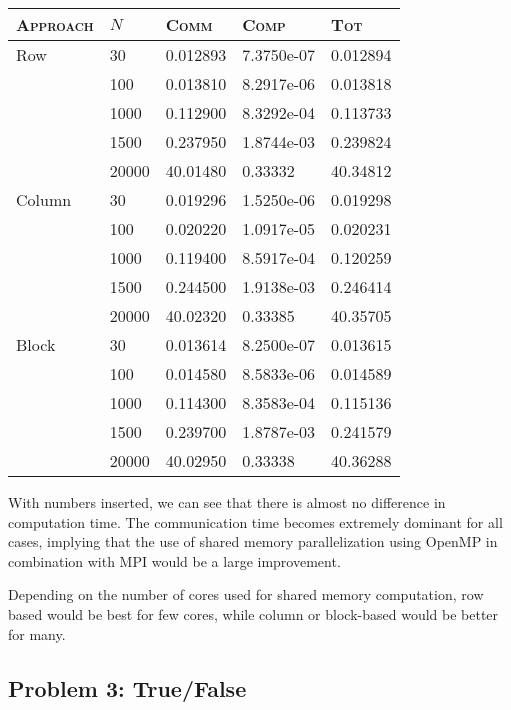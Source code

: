 \begin{center}
  \begin{tabular}{ll|lll}
    \toprule
    \textsc{Approach} & $N$ & \textsc{Comm}& \textsc{Comp}  & \textsc{Tot} \\
    \midrule
    Row    & 30    & 0.012893 & 7.3750e-07 & 0.012894 \\
           & 100   & 0.013810 & 8.2917e-06 & 0.013818 \\
           & 1000  & 0.112900 & 8.3292e-04 & 0.113733 \\
           & 1500  & 0.237950 & 1.8744e-03 & 0.239824 \\
           & 20000 & 40.01480 & 0.33332    & 40.34812 \\
    \midrule
    Column & 30    & 0.019296 & 1.5250e-06 & 0.019298 \\
           & 100   & 0.020220 & 1.0917e-05 & 0.020231 \\
           & 1000  & 0.119400 & 8.5917e-04 & 0.120259 \\
           & 1500  & 0.244500 & 1.9138e-03 & 0.246414 \\
           & 20000 & 40.02320 & 0.33385   & 40.35705 \\
    \midrule
    Block  & 30    & 0.013614 & 8.2500e-07 & 0.013615 \\
           & 100   & 0.014580 & 8.5833e-06 & 0.014589 \\
           & 1000  & 0.114300 & 8.3583e-04 & 0.115136 \\
           & 1500  & 0.239700 & 1.8787e-03 & 0.241579 \\
           & 20000 & 40.02950 & 0.33338    & 40.36288 \\
    \bottomrule
  \end{tabular}
\end{center}

With numbers inserted, we can see that there is almost no difference in computation time. The communication time becomes extremely dominant for all cases, implying that the use of shared memory parallelization using OpenMP in combination with MPI would be a large improvement.

Depending on the number of cores used for shared memory computation, row based would be best for few cores, while column or block-based would be better for many.



\clearpage
\subsection{Problem 3: True/False} %
\label{sub:problem_3}

